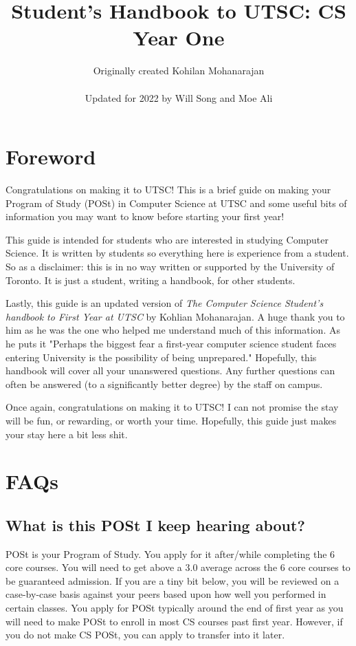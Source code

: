 \documentclass[11pt]{article}
\title{Student's Handbook to UTSC: CS Year One}
\author{Originally created Kohilan Mohanarajan \\ \\ Updated for 2022 by Will Song and Moe Ali}
\begin{document}
\maketitle
\newpage
\tableofcontents
\newpage
\section{Foreword}

Congratulations on making it to UTSC! This is a brief guide on making your Program of Study (POSt) in Computer Science at UTSC and some useful bits of information you may want to know before starting your first year!\par
This guide is intended for students who are interested in studying Computer Science. It is written by students so everything here is experience from a student. So as a disclaimer: this is in no way written or supported by the University of Toronto. It is just a student, writing a handbook, for other students. \par
Lastly, this guide is an updated version of \textit{The Computer Science Student's handbook to First Year at UTSC} by Kohlian Mohanarajan. A huge thank you to him as he was the one who helped me understand much of this information. As he puts it "Perhaps the biggest fear a first-year computer science student faces entering University is the possibility of being unprepared." Hopefully, this handbook will cover all your unanswered questions. Any further questions can often be answered (to a significantly better degree) by the staff on campus.\par
Once again, congratulations on making it to UTSC! I can not promise the stay will be fun, or rewarding, or worth your time. Hopefully, this guide just makes your stay here a bit less shit.

\section{FAQs}
\subsection{What is this POSt I keep hearing about?} POSt is your Program of Study. You apply for it after/while completing the 6 core courses. You will need to get above a 3.0 average across the 6 core courses to be guaranteed admission. If you are a tiny bit below, you will be reviewed on a case-by-case basis against your peers based upon how well you performed in certain classes. You apply for POSt typically around the end of first year as you will need to make POSt to enroll in most CS courses past first year. However, if you do not make CS POSt, you can apply to transfer into it later.\par
\end{document}
